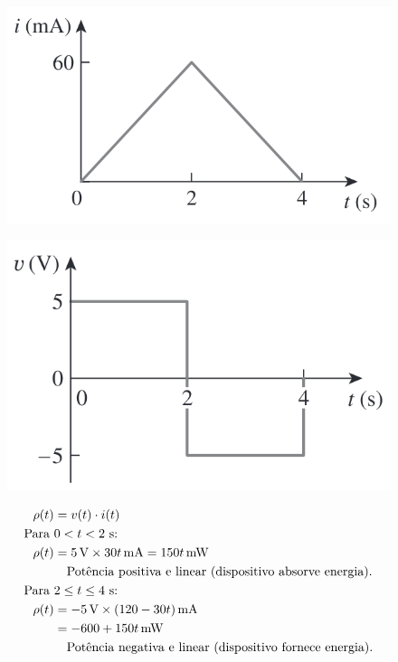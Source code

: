 \begin{enumerate}
\begin{enumerate}
		            \begin{figure}[H]
			            \centering
			            \includegraphics[height=0.15\textwidth]{./fig/fig8.png}
			            \caption{}
			            \label{fig:fig8}
		            \end{figure}
		            \begin{figure}[H]
			            \centering
			            \includegraphics[height=0.15\textwidth]{./fig/fig9.png}
			            \caption{}
			            \label{fig:fig9}
		            \end{figure}

		            \begin{minipage}{\linewidth}
			            \begin{align*}
				            \rho(t)      & = v(t) \cdot i(t)                                                      \\
				            \text{Para } & 0 < t < 2 \text{ s:}                                                   \\
				            \rho(t)      & = 5 \, \text{V} \times 30t \, \text{mA} = 150t \, \text{mW}            \\
				                         & \text{\quad Potência positiva e linear (dispositivo absorve energia).} \\
				            \text{Para } & 2 \leq t \leq 4 \text{ s:}                                             \\
				            \rho(t)      & = -5 \, \text{V} \times (120 - 30t) \, \text{mA}                       \\
				                         & = -600 + 150t \, \text{mW}                                             \\
				                         & \text{\quad Potência negativa e linear (dispositivo fornece energia).} \\
			            \end{align*}
		            \end{minipage}


\end{enumerate}
\end{enumerate}
